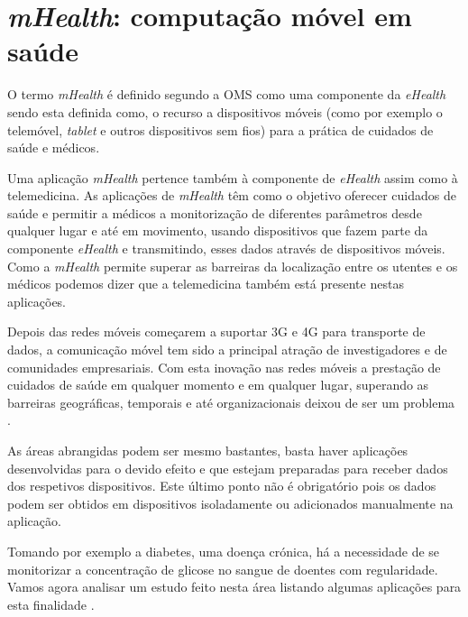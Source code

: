 \section{\textit{mHealth}: computação móvel em saúde}
O termo \textit{\gls{mHealth}} \'e definido segundo a OMS como uma componente da \textit{eHealth} \cite{mhealth_oms} sendo esta definida como, o recurso a dispositivos m\'oveis (como por exemplo o telem\'ovel, \textit{tablet} e outros dispositivos sem fios) para a pr\'atica de cuidados de sa\'ude e m\'edicos.
\par
Uma aplica\c c\~ao \textit{mHealth} pertence tamb\'em \`a componente de \textit{eHealth} assim como \`a telemedicina. As aplica\c c\~oes de \textit{mHealth} t\^em como o objetivo oferecer cuidados de sa\'ude e permitir a m\'edicos a monitoriza\c c\~ao de diferentes par\^ametros desde qualquer lugar e at\'e em movimento, usando dispositivos que fazem parte da componente \textit{eHealth} e transmitindo, esses dados atrav\'es de dispositivos m\'oveis. Como a \textit{mHealth} permite superar as barreiras da localiza\c c\~ao entre os utentes e os m\'edicos podemos dizer que a telemedicina tamb\'em est\'a presente nestas aplica\c c\~oes.
\par
Depois das redes m\'oveis come\c carem a suportar 3G e 4G para transporte de dados, a comunica\c c\~ao m\'ovel tem sido a  principal atra\c c\~ao de investigadores e de comunidades empresariais. Com esta inova\c c\~ao nas redes m\'oveis a presta\c c\~ao de cuidados de sa\'ude em qualquer momento e em qualquer lugar, superando as barreiras geogr\'aficas, temporais e at\'e organizacionais deixou de ser um problema \cite{mhealth}.
\par
As \'areas abrangidas podem ser mesmo bastantes, basta haver aplica\c c\~oes desenvolvidas para o devido efeito e que estejam preparadas para receber dados dos respetivos dispositivos. Este \'ultimo ponto não \'e obrigat\'orio pois os dados podem ser obtidos em dispositivos isoladamente ou adicionados manualmente na aplica\c c\~ao. 
\par
Tomando por exemplo a diabetes, uma doença crónica, há a necessidade de se monitorizar a concentra\c c\~ao de glicose no sangue de doentes com regularidade. Vamos agora analisar um estudo feito nesta área listando algumas aplica\c c\~oes para esta finalidade \cite{mhealth}.

